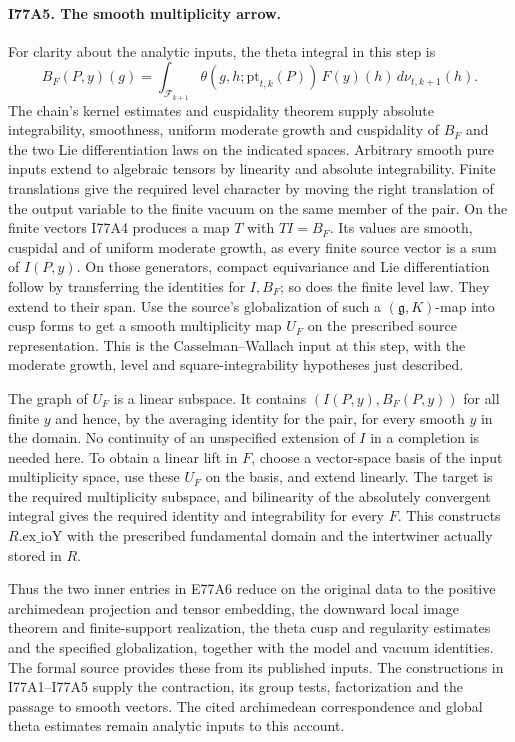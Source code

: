 \paragraph{I77A5. The smooth multiplicity arrow.}
For clarity about the analytic inputs, the theta integral in this step
is
\[
 B_F(P,y)(g)=\int_{\mathcal F_{k+1}}
      \theta(g,h;\mathrm{pt}_{t,k}(P))\,F(y)(h)\,d\nu_{t,k+1}(h).
\]
The chain's kernel estimates and cuspidality theorem supply absolute
integrability, smoothness, uniform moderate growth and cuspidality
of $B_F$ and the two Lie differentiation laws on the indicated
spaces. Arbitrary smooth pure inputs extend to algebraic tensors by
linearity and absolute integrability. Finite translations give
the required level character by moving the right translation of
the output variable to the finite vacuum on the same member of the pair. On the
finite vectors I77A4 produces a map $T$ with $T I=B_F$. Its values
are smooth, cuspidal and of uniform moderate growth, as every finite
source vector is a sum of $I(P,y)$. On those generators, compact
equivariance and Lie differentiation follow by transferring the
identities for $I,B_F$; so does the finite level law. They extend to
their span. Use the source's globalization of such a
$(\mathfrak g,K)$-map into cusp forms to get a smooth multiplicity
map $U_F$ on the prescribed source representation. This is the
Casselman--Wallach input at this step, with the moderate growth,
level and square-integrability hypotheses just described.

The graph of $U_F$ is a linear subspace. It contains
$(I(P,y),B_F(P,y))$ for all finite $y$ and hence, by the averaging
identity for the pair, for every smooth $y$ in the domain. No
continuity of an unspecified extension of $I$ in a completion is
needed here. To obtain a linear lift in $F$, choose a vector-space
basis of the input multiplicity space, use these $U_F$ on the basis,
and extend linearly. The target is the required multiplicity
subspace, and bilinearity of the absolutely convergent integral gives
the required identity and integrability for every $F$. This
constructs $R.\mathrm{ex\_ioY}$ with the prescribed fundamental
domain and the intertwiner actually stored in $R$.

Thus the two inner entries in E77A6 reduce on the original data to
the positive archimedean projection and tensor embedding, the
downward local image theorem and finite-support realization, the
theta cusp and regularity estimates and the specified globalization,
together with the model and vacuum identities. The formal source
provides these from its published inputs. The constructions in
I77A1--I77A5 supply the contraction, its group tests, factorization
and the passage to smooth vectors. The cited archimedean correspondence
and global theta estimates remain analytic inputs to this account.
